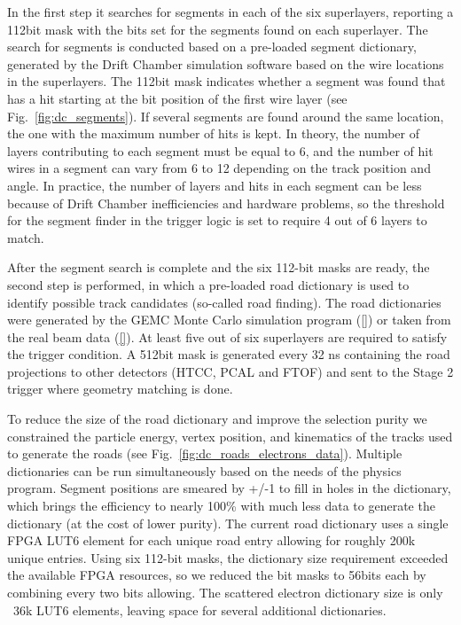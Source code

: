 In the first step it searches for segments in each of the six superlayers, reporting a 112bit mask with the bits set for the segments found on each superlayer. The search for segments is conducted based on a pre-loaded segment dictionary, generated by the Drift Chamber simulation software based on the wire locations in the superlayers. The 112bit mask indicates whether a segment was found that has a hit starting at the bit position of the first wire layer (see Fig.~\ref{fig:dc_segments}). If several segments are found around the same location, the one with the maximum number of hits is kept. In theory, the number of layers contributing to each segment must be equal to 6, and the number of hit wires in a segment can vary from 6 to 12 depending on the track position and angle. In practice, the number of layers and hits in each segment can be less because of Drift Chamber inefficiencies and hardware problems, so the threshold for the segment finder in the trigger logic is set to require 4 out of 6 layers to match.

After the segment search is complete and the six 112-bit masks are ready, the second step is performed, in which a pre-loaded road dictionary is used to identify possible track candidates (so-called road finding). The road dictionaries were generated by the GEMC Monte Carlo simulation program (\ref{}) or taken from the real beam data (\ref{}). At least five out of six superlayers are required to satisfy the trigger condition. A 512bit mask is generated every 32 ns containing the road projections to other detectors (HTCC, PCAL and FTOF) and sent to the Stage 2 trigger where geometry matching is done.

To reduce the size of the road dictionary and improve the selection purity we constrained the particle energy, vertex position, and kinematics of the tracks used to generate the roads (see Fig.~\ref{fig:dc_roads_electrons_data}). Multiple dictionaries can be run simultaneously based on the needs of the physics program. Segment positions are smeared by +/-1 to fill in holes in the dictionary, which brings the efficiency to nearly 100\% with much less data to generate the dictionary (at the cost of lower purity). The current road dictionary uses a single FPGA LUT6 element for each unique road entry allowing for roughly 200k unique entries. Using six 112-bit masks, the dictionary size requirement exceeded the available FPGA resources, so we reduced the bit masks to 56bits each by combining every two bits allowing. The scattered electron dictionary size is only ~36k LUT6 elements, leaving space for several additional dictionaries.

